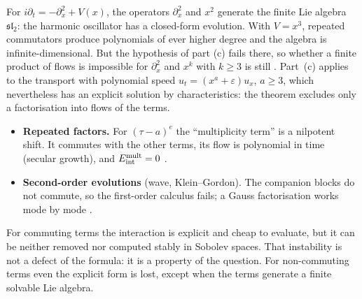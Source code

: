 \begin{example}
For $i\partial_t=-\partial_x^2+V(x)$, the operators $\partial_x^2$ and $x^2$ generate the finite Lie algebra $\mathfrak{sl}_2$: the harmonic oscillator has a closed-form evolution. With $V=x^3$, repeated commutators produce polynomials of ever higher degree and the algebra is infinite-dimensional. But the hypothesis of part (c) fails there, so whether a finite product of flows is impossible for $\partial_x^2$ and $x^k$ with $k\ge3$ is still \openq{} . Part~(c) applies to the transport with polynomial speed $u_t=(x^a+\varepsilon)u_x$, $a\ge3$, which nevertheless has an explicit solution by characteristics: the theorem excludes only a factorisation into flows of the terms.
\end{example}

\begin{caution}[title={Other ways commutativity is lost}]
\begin{itemize}
\item \textbf{Repeated factors.} For $(\tau-a)^e$ the ``multiplicity term'' is a nilpotent shift. It commutes with the other terms, its flow is polynomial in time (secular growth), and $E_{\mathrm{int}}^{\mathrm{mult}}=0$  \pw.
\item \textbf{Second-order evolutions} (wave, Klein--Gordon). The companion blocks do not commute, so the first-order calculus fails; a Gauss factorisation works mode by mode  \proved.
\end{itemize}
\end{caution}

\begin{keypoint}
For commuting terms the interaction is explicit and cheap to evaluate, but it can be neither removed nor computed stably in Sobolev spaces. That instability is not a defect of the formula: it is a property of the question. For non-commuting terms even the explicit form is lost, except when the terms generate a finite solvable Lie algebra.
\end{keypoint}

